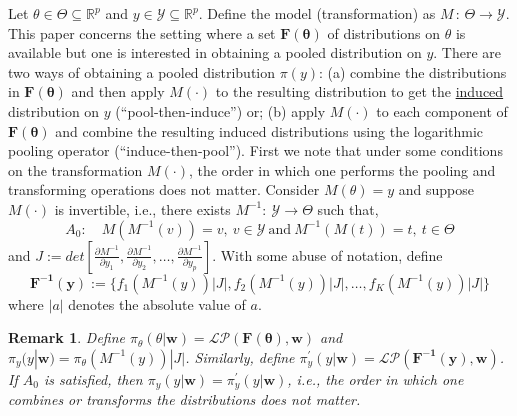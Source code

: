 \documentclass[11pt]{article}
\newtheorem{rmk}{Remark}[]
\begin{document}
Let $\theta \in \Theta \subseteq \mathbb{R}^p$ and $y \in \mathcal{Y} \subseteq \mathbb{R}^p$. 
Define the model (transformation) as $M \,:\, \Theta \to \mathcal{Y}$. 
This paper concerns the setting where a set $\mathbf{F(\theta)}$ of distributions on $\theta$ is available but one is interested in obtaining a pooled distribution on $y$.
There are two ways of obtaining a pooled distribution $\pi(y)$: (a) combine the distributions in $\mathbf{F(\theta)}$ and then apply $M(\cdot)$ to the resulting distribution to get the \underline{induced} distribution on $y$ (``pool-then-induce'') or; (b) apply  $M(\cdot)$ to each component of $\mathbf{F(\theta)}$ and combine the resulting induced distributions using the logarithmic pooling operator (``induce-then-pool''). 
First we note that under some conditions on the transformation $M(\cdot)$, the order in which one performs the pooling and transforming operations does not matter.
Consider $M(\theta) = y$ and suppose $M(\cdot)$ is invertible, i.e., there exists $M^{-1}: \: \mathcal{Y} \to \Theta$ such that,
\[A_0:\quad M(M^{-1}(v)) = v,\: v \in \mathcal{Y}\: \text{and}\: M^{-1}(M(t)) = t, \: t \in \Theta \]
and $J := det \left[ \frac{\partial M^{-1}}{\partial y_1}, \frac{\partial M^{-1}}{\partial y_2}, \ldots, \frac{\partial M^{-1}}{\partial y_p}\right]$.
With some abuse of notation, define
\begin{equation}
 \label{eq:transfF}
 \mathbf{F^{-1}(y)} := \{f_1(M^{-1}(y))|J|, f_2(M^{-1}(y))|J|, \ldots, f_K(M^{-1}(y))|J|\}
\end{equation}
where $|a|$ denotes the absolute value of $a$.
\begin{rmk}
\label{rmk:invariance}
Define $\pi_{\theta}(\theta | \mathbf{w}) =  \mathcal{LP}(\mathbf{F(\theta)}, \mathbf{w})$ and $\pi_{y}(y |\mathbf{w}) = \pi_{\theta}(M^{-1}(y))|J|$.
Similarly, define $\pi^{\prime}_{y}(y|\mathbf{w}) = \mathcal{LP}(\mathbf{F^{-1}(y)}, \mathbf{w})$.
If $A_0$ is satisfied, then $\pi_{y}(y |\mathbf{w}) = \pi^{\prime}_{y}(y|\mathbf{w})$, i.e., the order in which one combines or transforms the distributions does not matter.
\end{rmk}
\end{document}
